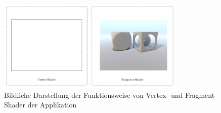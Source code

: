 \begin{figure}[H]
    \centering
    \includegraphics[width=0.8\textwidth]{img/prototype_shaders.pdf}
    \caption{Bildliche Darstellung der Funktionsweise von Vertex- und
        Fragment-Shader der Applikation\protect\footnotemark}\label{fig:prototype_shaders}
\end{figure}
